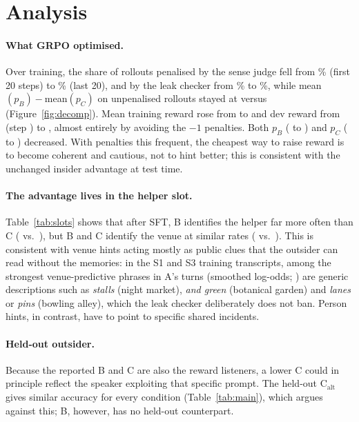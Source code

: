 \section{Analysis}\label{sec:analysis}
\paragraph{What GRPO optimised.} Over training, the share of rollouts penalised by the sense judge fell from \% (first 20 steps) to \% (last 20), and by the leak checker from \% to \%, while mean$(p_B)-$mean$(p_C)$ on unpenalised rollouts stayed at  versus  (Figure~\ref{fig:decomp}).
Mean training reward rose from  to  and dev reward from  (step ) to , almost entirely by avoiding the $-1$ penalties. Both $p_B$ ( to ) and $p_C$ ( to ) decreased.
With penalties this frequent, the cheapest way to raise reward is to become coherent and cautious, not to hint better; this is consistent with the unchanged insider advantage at test time.
\paragraph{The advantage lives in the helper slot.} Table~\ref{tab:slots} shows that after SFT, B identifies the helper far more often than C ( vs.\ ), but B and C identify the venue at similar rates ( vs.\ ).
This is consistent with venue hints acting mostly as public clues that the outsider can read without the memories: in the S1 and S3 training transcripts, among the strongest venue-predictive phrases in A's turns (smoothed log-odds; ) are generic descriptions such as \emph{stalls} (night market), \emph{and green} (botanical garden) and \emph{lanes} or \emph{pins} (bowling alley), which the leak checker deliberately does not ban. Person hints, in contrast, have to point to specific shared incidents.
\paragraph{Held-out outsider.} Because the reported B and C are also the reward listeners, a lower C could in principle reflect the speaker exploiting that specific prompt. The held-out C$_\text{alt}$ gives similar accuracy for every condition (Table~\ref{tab:main}), which argues against this; B, however, has no held-out counterpart.
